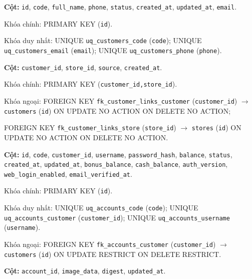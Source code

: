 \begin{description}[leftmargin=3.6cm,labelwidth=3.4cm,style=nextline]

\item[\texttt{customers}] \textbf{Cột:} \texttt{id}, \texttt{code}, \texttt{full\_name}, \texttt{phone}, \texttt{status}, \texttt{created\_at}, \texttt{updated\_at}, \texttt{email}.

Khóa chính: PRIMARY KEY (\texttt{id}).

Khóa duy nhất: UNIQUE \texttt{uq\_customers\_code} (\texttt{code}); UNIQUE \texttt{uq\_customers\_email} (\texttt{email}); UNIQUE \texttt{uq\_customers\_phone} (\texttt{phone}).

\item[\texttt{customer\_store\_links}] \textbf{Cột:} \texttt{customer\_id}, \texttt{store\_id}, \texttt{source}, \texttt{created\_at}.

Khóa chính: PRIMARY KEY (\texttt{customer\_id,store\_id}).

Khóa ngoại: FOREIGN KEY \texttt{fk\_customer\_links\_customer} (\texttt{customer\_id}) $\rightarrow$ \texttt{customers} (\texttt{id}) ON UPDATE NO ACTION ON DELETE NO ACTION;\par FOREIGN KEY \texttt{fk\_customer\_links\_store} (\texttt{store\_id}) $\rightarrow$ \texttt{stores} (\texttt{id}) ON UPDATE NO ACTION ON DELETE NO ACTION.

\item[\texttt{accounts}] \textbf{Cột:} \texttt{id}, \texttt{code}, \texttt{customer\_id}, \texttt{username}, \texttt{password\_hash}, \texttt{balance}, \texttt{status}, \texttt{created\_at}, \texttt{updated\_at}, \texttt{bonus\_balance}, \texttt{cash\_balance}, \texttt{auth\_version}, \texttt{web\_login\_enabled}, \texttt{email\_verified\_at}.

Khóa chính: PRIMARY KEY (\texttt{id}).

Khóa duy nhất: UNIQUE \texttt{uq\_accounts\_code} (\texttt{code}); UNIQUE \texttt{uq\_accounts\_customer} (\texttt{customer\_id}); UNIQUE \texttt{uq\_accounts\_username} (\texttt{username}).

Khóa ngoại: FOREIGN KEY \texttt{fk\_accounts\_customer} (\texttt{customer\_id}) $\rightarrow$ \texttt{customers} (\texttt{id}) ON UPDATE RESTRICT ON DELETE RESTRICT.

\item[\texttt{customer\_avatars}] \textbf{Cột:} \texttt{account\_id}, \texttt{image\_data}, \texttt{digest}, \texttt{updated\_at}.


\end{description}
